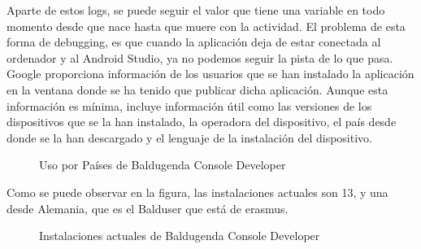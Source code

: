 Aparte de estos logs, se puede seguir el valor que tiene una variable en todo momento desde que nace hasta que muere con la actividad.
El problema de esta forma de debugging, es que cuando la aplicación deja de estar conectada al ordenador y al Android Studio, ya no podemos seguir la pista de lo que pasa.
Google proporciona información de los usuarios que se han instalado la aplicación en la ventana donde se ha tenido que publicar dicha aplicación. Aunque esta información es mínima, incluye información útil como las versiones de los dispositivos que se la han instalado, la operadora del dispositivo, el país desde donde se la han descargado y el lenguaje de la instalación del dispositivo.
\newpage
\begin{figure}[H] 
  \begin{center} 
    \caption{Uso por Países de Baldugenda Console Developer} 
    \label{fig:UsoPorPaises} 
  \end{center} 
\end{figure}

Como se puede observar en la figura, las instalaciones actuales son 13, y una desde Alemania, que es el Balduser que está de erasmus.

\begin{figure}[H] 
  \begin{center} 
    \caption{Instalaciones actuales de Baldugenda Console Developer} 
    \label{fig:InstalacionesActuales} 
  \end{center} 
\end{figure}

